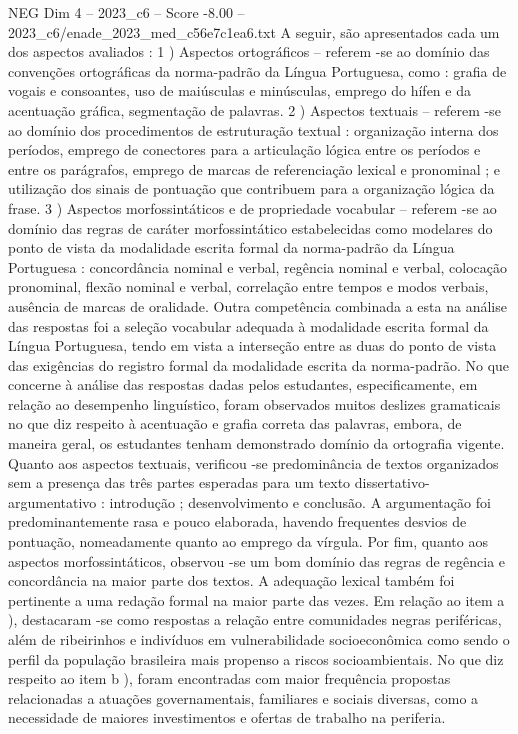 \begin{textsample}{NEG Dim 4 – 2023\_c6 – Score -8.00 – 2023\_c6/enade\_2023\_med\_c56e7c1ea6.txt}
A seguir, são apresentados cada um dos aspectos avaliados : 1 ) Aspectos ortográficos – referem -se ao domínio das convenções ortográficas da norma-padrão da Língua Portuguesa, como : grafia de vogais e consoantes, uso de maiúsculas e minúsculas, emprego do hífen e da acentuação gráfica, segmentação de palavras. 2 ) Aspectos textuais – referem -se ao domínio dos procedimentos de estruturação textual : organização interna dos períodos, emprego de conectores para a articulação lógica entre os períodos e entre os parágrafos, emprego de marcas de referenciação lexical e pronominal ; e utilização dos sinais de pontuação que contribuem para a organização lógica da frase. 3 ) Aspectos morfossintáticos e de propriedade vocabular – referem -se ao domínio das regras de caráter morfossintático estabelecidas como modelares do ponto de vista da modalidade escrita formal da norma-padrão da Língua Portuguesa : concordância nominal e verbal, regência nominal e verbal, colocação pronominal, flexão nominal e verbal, correlação entre tempos e modos verbais, ausência de marcas de oralidade.
Outra competência combinada a esta na análise das respostas foi a seleção vocabular adequada à modalidade escrita formal da Língua Portuguesa, tendo em vista a interseção entre as duas do ponto de vista das exigências do registro formal da modalidade escrita da norma-padrão.
No que concerne à análise das respostas dadas pelos estudantes, especificamente, em relação ao desempenho linguístico, foram observados muitos deslizes gramaticais no que diz respeito à acentuação e grafia correta das palavras, embora, de maneira geral, os estudantes tenham demonstrado domínio da ortografia vigente.
Quanto aos aspectos textuais, verificou -se predominância de textos organizados sem a presença das três partes esperadas para um texto dissertativo-argumentativo : introdução ; desenvolvimento e conclusão.
A argumentação foi predominantemente rasa e pouco elaborada, havendo frequentes desvios de pontuação, nomeadamente quanto ao emprego da vírgula.
Por fim, quanto aos aspectos morfossintáticos, observou -se um bom domínio das regras de regência e concordância na maior parte dos textos.
A adequação lexical também foi pertinente a uma redação formal na maior parte das vezes.
Em relação ao item a ), destacaram -se como respostas a relação entre comunidades negras periféricas, além de ribeirinhos e indivíduos em vulnerabilidade socioeconômica como sendo o perfil da população brasileira mais propenso a riscos socioambientais.
No que diz respeito ao item b ), foram encontradas com maior frequência propostas relacionadas a atuações governamentais, familiares e sociais diversas, como a necessidade de maiores investimentos e ofertas de trabalho na periferia.

\end{textsample}
